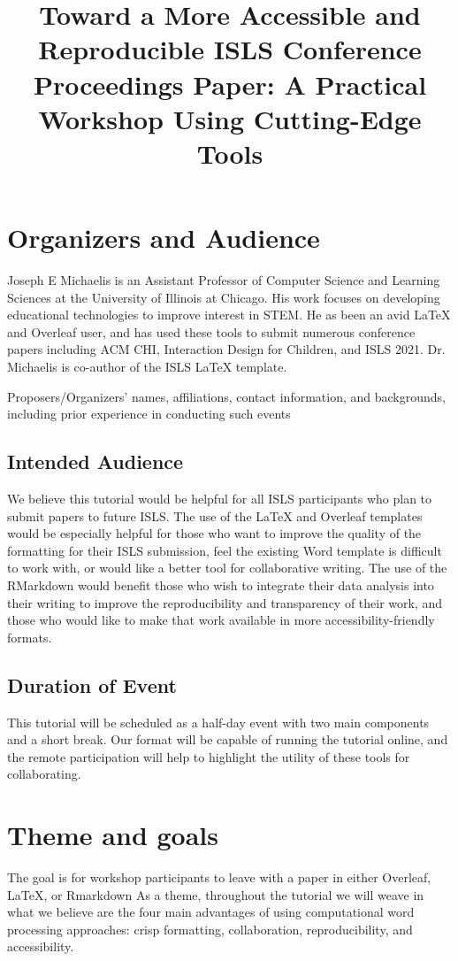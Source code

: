 \documentclass{article}
\title{Toward a More Accessible and Reproducible ISLS Conference Proceedings Paper: A Practical Workshop Using Cutting-Edge Tools}
\author{     }
\date{     }
\begin{document}
\section{Organizers and Audience}
Joseph E Michaelis is an Assistant Professor of Computer Science and Learning Sciences at the University of Illinois at Chicago. His work focuses on developing educational technologies to improve interest in STEM. He as been an avid LaTeX and Overleaf user, and has used these tools to submit numerous conference papers including ACM CHI, Interaction Design for Children, and ISLS 2021. Dr. Michaelis is co-author of the ISLS LaTeX template.

Proposers/Organizers’ names, affiliations, contact information, and backgrounds, including prior experience in conducting such events

\subsection{Intended Audience}
We believe this tutorial would be helpful for all ISLS participants who plan to submit papers to future ISLS. The use of the LaTeX and Overleaf templates would be especially helpful for those who want to improve the quality of the formatting for their ISLS submission, feel the existing Word template is difficult to work with, or would like a better tool for collaborative writing. The use of the RMarkdown would benefit those who wish to integrate their data analysis into their writing to improve the reproducibility and transparency of their work, and those who would like to make that work available in more accessibility-friendly formats.

\subsection{Duration of Event}
This tutorial will be scheduled as a half-day event with two main components and a short break. Our format will be capable of running the tutorial online, and the remote participation will help to highlight the utility of these tools for collaborating.

\section{Theme and goals}
The goal is for workshop participants to leave with a paper in either Overleaf, LaTeX, or Rmarkdown
As a theme, throughout the tutorial we will weave in what we believe are the four main advantages of using computational word processing approaches: crisp formatting, collaboration, reproducibility, and accessibility.
\end{document}
